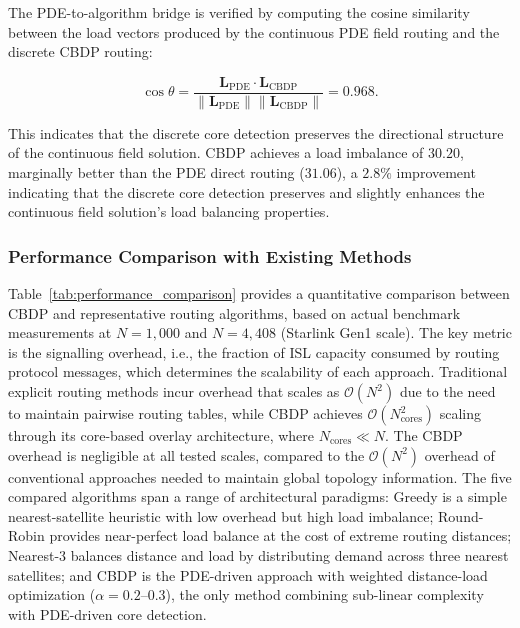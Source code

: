 \documentclass[sn-nature,pdflatex]{sn-jnl}
\begin{document}
The PDE-to-algorithm bridge is verified by computing the cosine similarity between the load vectors produced by the continuous PDE field routing and the discrete CBDP routing:

\begin{equation}
\cos\theta = \frac{\mathbf{L}_{\text{PDE}} \cdot \mathbf{L}_{\text{CBDP}}}{\|\mathbf{L}_{\text{PDE}}\| \|\mathbf{L}_{\text{CBDP}}\|} = 0.968.
\end{equation}

This indicates that the discrete core detection preserves the directional structure of the continuous field solution.
CBDP achieves a load imbalance of $30.20$, marginally better than the PDE direct routing ($31.06$), a $2.8\%$ improvement indicating that the discrete core detection preserves and slightly enhances the continuous field solution's load balancing properties.

\subsubsection{Performance Comparison with Existing Methods}

Table~\ref{tab:performance_comparison} provides a quantitative comparison between CBDP and representative routing algorithms, based on actual benchmark measurements at $N=1,000$ and $N=4,408$ (Starlink Gen1 scale).
The key metric is the signalling overhead, i.e., the fraction of ISL capacity consumed by routing protocol messages, which determines the scalability of each approach.
Traditional explicit routing methods incur overhead that scales as $\mathcal{O}(N^2)$ due to the need to maintain pairwise routing tables, while CBDP achieves $\mathcal{O}(N_{\text{cores}}^2)$ scaling through its core-based overlay architecture, where $N_{\text{cores}} \ll N$.
The CBDP overhead is negligible at all tested scales, compared to the $\mathcal{O}(N^2)$ overhead of conventional approaches needed to maintain global topology information.
The five compared algorithms span a range of architectural paradigms: Greedy is a simple nearest-satellite heuristic with low overhead but high load imbalance; Round-Robin provides near-perfect load balance at the cost of extreme routing distances; Nearest-3 balances distance and load by distributing demand across three nearest satellites; and CBDP is the PDE-driven approach with weighted distance-load optimization ($\alpha=0.2$--$0.3$), the only method combining sub-linear complexity with PDE-driven core detection.
\end{document}
